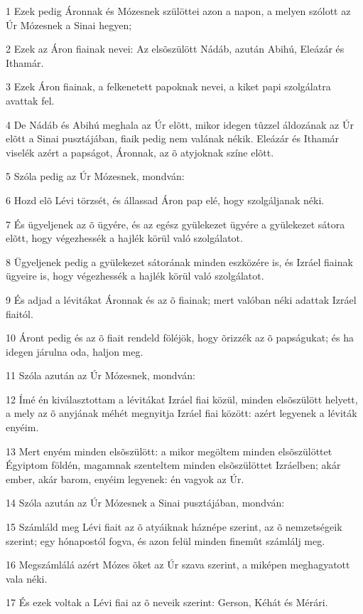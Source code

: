 \par 1 Ezek pedig Áronnak és Mózesnek szülöttei azon a napon, a melyen szólott az Úr Mózesnek a Sinai hegyen;
\par 2 Ezek az Áron fiainak nevei: Az elsõszülött Nádáb, azután Abihú, Eleázár és Ithamár.
\par 3 Ezek Áron fiainak, a felkenetett papoknak nevei, a kiket papi szolgálatra avattak fel.
\par 4 De Nádáb és Abihú meghala az Úr elõtt, mikor idegen tûzzel áldozának az Úr elõtt a Sinai pusztájában, fiaik pedig nem valának nékik. Eleázár és Ithamár viselék azért a papságot, Áronnak, az õ atyjoknak színe elõtt.
\par 5 Szóla pedig az Úr Mózesnek, mondván:
\par 6 Hozd elõ Lévi törzsét, és állassad Áron pap elé, hogy szolgáljanak néki.
\par 7 És ügyeljenek az õ ügyére, és az egész gyülekezet ügyére a gyülekezet sátora elõtt, hogy végezhessék a hajlék körül való  szolgálatot.
\par 8 Ügyeljenek pedig a gyülekezet sátorának minden eszközére is, és Izráel fiainak ügyeire is, hogy végezhessék a hajlék körül való szolgálatot.
\par 9 És adjad a lévitákat Áronnak és az õ fiainak; mert valóban néki adattak Izráel fiaitól.
\par 10 Áront pedig és az õ fiait rendeld föléjök, hogy õrizzék az õ papságukat; és ha idegen járulna oda, haljon meg.
\par 11 Szóla azután az Úr Mózesnek, mondván:
\par 12 Ímé én kiválasztottam a lévitákat Izráel fiai közül, minden elsõszülött helyett, a mely az õ anyjának méhét megnyitja  Izráel fiai között: azért legyenek a léviták enyéim.
\par 13 Mert enyém minden elsõszülött: a mikor megöltem minden elsõszülöttet Égyiptom földén, magamnak szenteltem minden elsõszülöttet Izráelben; akár ember, akár barom, enyéim legyenek: én vagyok az Úr.
\par 14 Szóla azután az Úr Mózesnek a Sinai pusztájában, mondván:
\par 15 Számláld meg Lévi fiait az õ atyáiknak háznépe szerint, az õ nemzetségeik szerint; egy hónapostól fogva, és azon felül minden finemût számlálj meg.
\par 16 Megszámlálá azért Mózes õket az Úr szava szerint, a miképen meghagyatott vala néki.
\par 17 És ezek voltak a Lévi fiai az õ neveik szerint: Gerson, Kéhát és Mérári.
